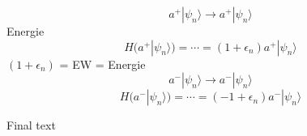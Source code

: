 \begin{equation}
	a^+ |\psi_n\rangle \rightarrow a^+ | \psi_n\rangle
\end{equation}
Energie
\begin{equation}
	H(a^+ | \psi_n\rangle) = \cdots
	= (1 + \epsilon_n) a^+ | \psi_n\rangle %
\end{equation}
$(1+\epsilon_n)$ = EW = Energie %
\begin{equation}
	a^- |\psi_n\rangle \rightarrow a^-|\psi_n\rangle
\end{equation}
\begin{equation}
	H(a^-|\psi_n\rangle) = \cdots
	= (-1 + \epsilon_n) a^- |\psi_n\rangle %
\end{equation}

Final text %
